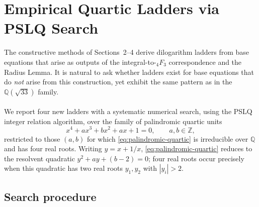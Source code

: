 \documentclass[12pt]{article}
\begin{document}
{\noindent {}




\section{Empirical Quartic Ladders via PSLQ Search}
\label{sec:empirical-quartic}


The constructive methods of Sections~2--4 derive dilogarithm ladders from
base equations that arise as outputs of the integral-to-${}_4F_3$
correspondence and the Radius Lemma. It is natural to ask whether ladders
exist for base equations that do \emph{not} arise from this construction, yet exhibit the same pattern as in the $\mathbb{Q}(\sqrt{33})$ family.
\\
\\
\noindent We report four new ladders with a systematic numerical search,
using the PSLQ integer relation algorithm, over the family of palindromic
quartic units
\begin{equation}
  x^4 + a x^3 + b x^2 + a x + 1 = 0, \qquad a,b \in \mathbb{Z},
  \label{eq:palindromic-quartic}
\end{equation}
restricted to those $(a,b)$ for which \eqref{eq:palindromic-quartic} is
irreducible over $\mathbb{Q}$ and has four real roots. Writing
$y = x + 1/x$, \eqref{eq:palindromic-quartic} reduces to the resolvent
quadratic $y^2 + ay + (b-2) = 0$; four real roots occur precisely when
this quadratic has two real roots $y_1, y_2$ with $|y_i| > 2$.

\subsection{Search procedure}

}
\end{document}
